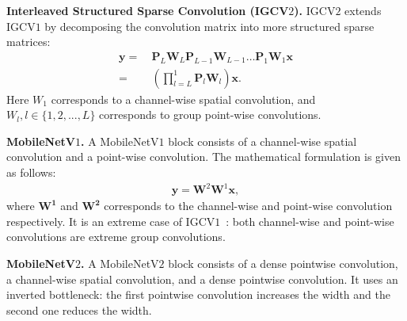 \documentclass{bmvc2k}
\begin{document}
	
	\noindent\textbf{Interleaved Structured Sparse Convolution (IGCV$2$).}
	IGCV$2$ extends IGCV$1$
	by decomposing the convolution matrix into more structured sparse matrices:
	\begin{align}
	\mathbf{y} =~& \mathbf{P}_L\mathbf{W}_L \mathbf{P}_{L-1}\mathbf{W}_{L-1} \dots \mathbf{P}_1\mathbf{W}_1 \mathbf{x} \\
	=~& (\prod\nolimits_{l=L}^1 \mathbf{P}_l \mathbf{W}_l) \mathbf{x}.
	\label{eqn:ISSC}
	\end{align}
	Here $W_1$ corresponds to a channel-wise spatial convolution,
	and $W_l, l\in\{1,2,...,L\}$ corresponds to group point-wise convolutions.
	
	\noindent\textbf{MobileNetV$1$.}
	A MobileNetV$1$ block consists of a channel-wise spatial convolution
	and a point-wise convolution. The mathematical formulation
	is given as follows:
	\begin{align}
	\mathbf{y} = \mathbf{W}^2\mathbf{W}^1 \mathbf{x},
	\label{eqn:mnv1}
	\end{align}
	\noindent where $\mathbf{W^1}$ and $\mathbf{W^2}$ corresponds
	to the channel-wise and point-wise convolution respectively.
	It is an extreme case of IGCV$1$~\cite{zhang2017interleaved}:
	both channel-wise and point-wise convolutions
	are extreme group convolutions.
	
	\noindent\textbf{MobileNetV$2$.}
	A MobileNetV$2$ block consists of a dense pointwise convolution, a channel-wise spatial convolution, and a dense pointwise convolution.
	It uses an inverted bottleneck:
	the first pointwise convolution
	increases the width and
	the second one reduces the width.
	
	\iffalse
	Our empirical results show that the channel-wise spatial convolution
	can be conducted firstly,
	and accordingly it is mathematically formulated
	as
	\begin{align}
	\mathbf{y} = \mathbf{W}^2\mathbf{W}^1\mathbf{W}^0 \mathbf{{x}}，
	\label{eqn:mnv2}
	\end{align}
	where $\mathbf{W}^0$
	corresponds to the channel-wise convolution,
	and $\mathbf{W}^1$, $\mathbf{W}^2$ are two low-rank matrices
	which correspond to the two dense point-wise convolutions.
	\fi
	
\end{document}
